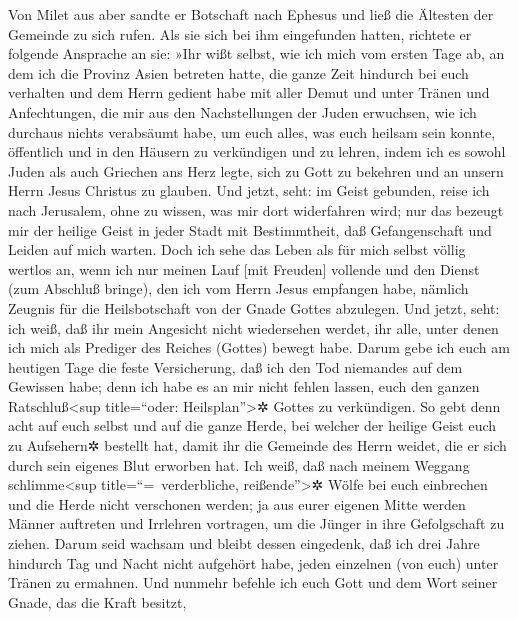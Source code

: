  Von Milet aus aber sandte er Botschaft nach Ephesus und
ließ die Ältesten der Gemeinde zu sich rufen.  Als sie
sich bei ihm eingefunden hatten, richtete er folgende Ansprache an sie:
»Ihr wißt selbst, wie ich mich vom ersten Tage ab, an dem ich die
Provinz Asien betreten hatte, die ganze Zeit hindurch bei euch verhalten
 und dem Herrn gedient habe mit aller Demut und unter
Tränen und Anfechtungen, die mir aus den Nachstellungen der Juden
erwuchsen,  wie ich durchaus nichts verabsäumt habe, um
euch alles, was euch heilsam sein konnte, öffentlich und in den Häusern
zu verkündigen und zu lehren,  indem ich es sowohl Juden
als auch Griechen ans Herz legte, sich zu Gott zu bekehren und an unsern
Herrn Jesus Christus zu glauben.  Und jetzt, seht: im
Geist gebunden, reise ich nach Jerusalem, ohne zu wissen, was mir dort
widerfahren wird;  nur das bezeugt mir der heilige Geist
in jeder Stadt mit Bestimmtheit, daß Gefangenschaft und Leiden auf mich
warten.  Doch ich sehe das Leben als für mich selbst
völlig wertlos an, wenn ich nur meinen Lauf {[}mit Freuden{]} vollende
und den Dienst (zum Abschluß bringe), den ich vom Herrn Jesus empfangen
habe, nämlich Zeugnis für die Heilsbotschaft von der Gnade Gottes
abzulegen.  Und jetzt, seht: ich weiß, daß ihr mein
Angesicht nicht wiedersehen werdet, ihr alle, unter denen ich mich als
Prediger des Reiches (Gottes) bewegt habe.  Darum gebe
ich euch am heutigen Tage die feste Versicherung, daß ich den Tod
niemandes auf dem Gewissen habe;  denn ich habe es an mir
nicht fehlen lassen, euch den ganzen Ratschluß\textless sup
title=``oder: Heilsplan''\textgreater✲ Gottes zu verkündigen.
 So gebt denn acht auf euch selbst und auf die ganze
Herde, bei welcher der heilige Geist euch zu Aufsehern✲ bestellt hat,
damit ihr die Gemeinde des Herrn weidet, die er sich durch sein eigenes
Blut erworben hat.  Ich weiß, daß nach meinem Weggang
schlimme\textless sup title=``=~verderbliche, reißende''\textgreater✲
Wölfe bei euch einbrechen und die Herde nicht verschonen werden;
 ja aus eurer eigenen Mitte werden Männer auftreten und
Irrlehren vortragen, um die Jünger in ihre Gefolgschaft zu ziehen.
 Darum seid wachsam und bleibt dessen eingedenk, daß ich
drei Jahre hindurch Tag und Nacht nicht aufgehört habe, jeden einzelnen
(von euch) unter Tränen zu ermahnen.  Und nunmehr befehle
ich euch Gott und dem Wort seiner Gnade, das die Kraft besitzt,

